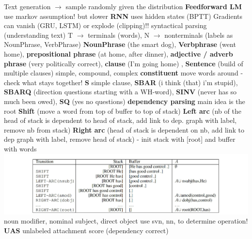 \documentclass[8pt]{extarticle}
\begin{document}
\begin{multicols*}{3}
\newline Text generation $ \rightarrow $ sample randomly given the distribution
\newline \textbf{Feedforward LM} use markov assumption! but slower
\newline \textbf{RNN} uses hidden states  (BPTT)
\newline Gradients can vanish (GRU, LSTM) or explode (clipping)!! 
\newline syntactical parsing (understanding text) T $\rightarrow$ terminals (words), N $\rightarrow$ nonterminals (labels as NounPhrase, VerbPhrase)
\newline \textbf{NounPhrase} (the smart dog), \textbf{Verbphrase} (went home), \textbf{prepositional phrase} (at home, after dinner), \textbf{adjective / adverb phrase} (very politically correct), \textbf{clause} (I'm going home) , \textbf{Sentence} (build of multiple clauses) simple, compound, complex
\newline \textbf{constituent} move words around - check what stays together!
\newline \textbf{S} simple clause, \textbf{SBAR} (i think (that) i'm stupid), \textbf{SBARQ} (direction questions starting with a WH-word), \textbf{SINV} (never has so much been owed), \textbf{SQ} (yes no questions)
\newline \textbf{dependency parsing} main idea is the root
\newline \textbf{Shift} (move a word from top of buffer to top of stack)
\newline \textbf{Left arc} (nb of the head of stack is dependent to head of stack, add link to dep. graph with label, remove nb from stack)
\newline \textbf{Right arc} (head of stack is dependent on nb, add link to dep graph with label, remove head of stack)
\newline [stack][buffer] - init stack with [root] and buffer with words
\includegraphics[width=\columnwidth]{arc}
\newline noun modifier, nominal subject, direct object
\newline use svn, nn, to determine operation!
\newline \textbf{UAS} unlabeled attachment score (dependency correct)

\end{multicols*}
\end{document}
